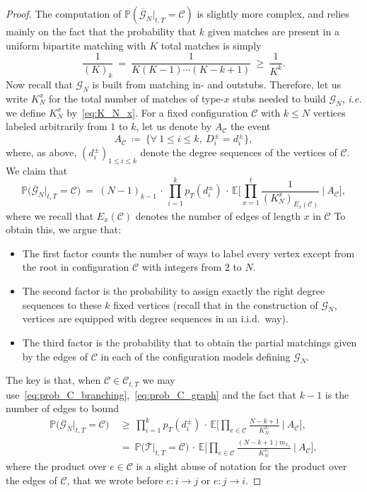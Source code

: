 \begin{refsegment}
\begin{proof}
The computation of
$\mathbb{P}(\overline{\mathcal{G}}_N|_{t,T} = \mathcal{C})$ is
slightly more complex, and relies mainly on the fact that the
probability that $k$ given matches are present in a uniform bipartite
matching with $K$ total matches is simply
\[
  \frac{1}{(K)_{k}}\ =\ \frac{1}{K (K-1) \cdots (K-k+1)} \ \geq\ \frac{1}{K^k}.
\]
Now recall that $\mathcal{G}_N$ is built from matching in- and
outstubs. Therefore, let us write $K^x_N$ for the total number of
matches of type-$x$ stubs needed to build $\mathcal{G}_N$,
\textit{i.e.} we define $K^x_N$ by~\eqref{eq:K_N_x}.
For a fixed configuration $\mathcal{C}$ with $k\leq N$ vertices
labeled arbitrarily from $1$ to $k$, let us denote by
$A_{\mathcal{C}}$ the event
\[
  A_{\mathcal{C}}\ \coloneqq\ \big\{ \forall\ 1\leq i\leq k, \ D^{\pm}_{i} = d^\pm_i \big\},
\]
where, as above, $(d^\pm_i)_{1\leq i\leq k}$ denote the degree
sequences of the vertices of $\mathcal{C}$. We claim that
\begin{equation}
  \label{eq:prob_C_graph}
  \mathbb{P}\big( \overline{\mathcal{G}}_N|_{t,T} = \mathcal{C} \big)\ =\
  (N-1)_{k-1} \,\cdot\, \prod_{i=1}^k p_T(d^\pm_i) \,\cdot\,
  \mathbb{E}\Big[\prod_{x=1}^t \frac{1}{(K_N^x)_{E_x(\mathcal{C})}} \ \Big\vert\ A_{\mathcal{C}} \Big],
\end{equation}
where we recall that $E_x(\mathcal{C})$ denotes the number of edges of
length $x$ in $\mathcal{C}$
To obtain this, we argue that:
\begin{itemize}
\item The first factor counts the number of ways to label every vertex
  except from the root in configuration $\mathcal{C}$ with integers
  from $2$ to $N$.
\item The second factor is the probability to assign exactly the right
  degree sequences to these $k$ fixed vertices (recall that in the
  construction of $\mathcal{G}_N$, vertices are equipped with degree
  sequences in an i.i.d.\ way).
\item The third factor is the probability that to obtain the partial
  matchings given by the edges of $\mathcal{C}$ in each of the
  configuration models defining $\mathcal{G}_N$.
\end{itemize}
The key is that, when $\mathcal{C}\in \mathscr{C}_{t,T}$ we may
use~\eqref{eq:prob_C_branching},~\eqref{eq:prob_C_graph} and the fact that $k-1$ is the number
of edges to bound
\begin{align}\nonumber
  \mathbb{P}\big( \overline{\mathcal{G}}_N|_{t,T} = \mathcal{C} \big)\ 
  &\geq\ 
    \prod_{i=1}^k p_T(d^\pm_i) \,\cdot\,
    \mathbb{E}\Big[\prod_{e\in \mathcal{C}}
  \frac{N-k+1}{K_{N}^{x_e}} \ \Big\vert\ A_{\mathcal{C}} \Big], \\
  &=\ \mathbb{P}\big( \overline{\mathcal{T}}|_{t,T} = \mathcal{C} \big) \,\cdot\,
    \mathbb{E}\Big[\prod_{e\in \mathcal{C}}
  \frac{(N-k+1)m_{x_e}}{K_{N}^{x_e}} \ \Big\vert\ A_{\mathcal{C}} \Big],
    \label{eq:prob_C-G_compare}
\end{align}
where the product over $e\in \mathcal{C}$ is a slight abuse of
notation for the product over the edges of $\mathcal{C}$, that we
wrote before $e: i\to j$ or $e:j\to i$.


\end{proof}
\end{refsegment}
